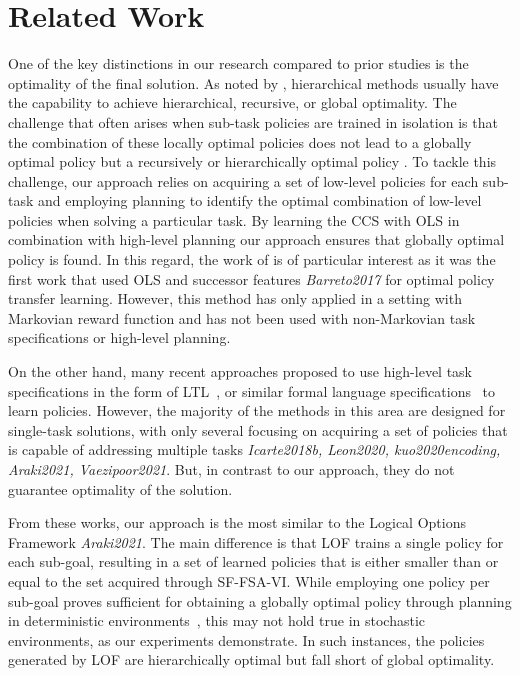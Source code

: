 \section{Related Work}
One of the key distinctions in our research compared to prior studies is the optimality of the final solution. As noted by \citep{Dietterich2000}, hierarchical methods usually have the capability to achieve hierarchical, recursive, or global optimality. The challenge that often arises when sub-task policies are trained in isolation is that the combination of these locally optimal policies does not lead to a globally optimal policy but a recursively \citep{Dayan1992} or hierarchically optimal policy \citep{Sutton1999, Mann2015, Araki2021}.  To tackle this challenge, our approach relies on acquiring a set of low-level policies for each sub-task and employing planning to identify the optimal combination of low-level policies when solving a particular task. By learning the CCS with OLS \citep{Roijers2014} in combination with high-level planning our approach ensures that globally optimal policy is found. In this regard, the work of \citep{Alegre2022} is of particular interest as it was the first work that used OLS and successor features \textit{Barreto2017} for optimal policy transfer learning. However, this method has only applied in a setting with Markovian reward function and has not been used with non-Markovian task specifications or high-level planning. 

On the other hand, many recent approaches proposed to use high-level task specifications in the form of LTL~\citep{Icarte2018b, Kuo2020, Vaezipoor2021, Jothimurugan2021}, or similar formal language specifications~\citep{ToroIcarte2019,Camacho2019, Araki2021, Icarte2022} to learn policies. However, the majority of the methods in this area are designed for single-task solutions, with only several focusing on acquiring a set of policies that is capable of addressing multiple tasks \textit{Icarte2018b, Leon2020, kuo2020encoding, Araki2021, Vaezipoor2021}. But, in contrast to our approach, they do not guarantee optimality of the solution.

From these works, our approach is the most similar to the Logical Options Framework \textit{Araki2021}. The main difference is that LOF trains a single policy for each sub-goal, resulting in a set of learned policies that is either smaller than or equal to the set acquired through SF-FSA-VI. While employing one policy per sub-goal proves sufficient for obtaining a globally optimal policy through planning in deterministic environments~\citep{Wen2020}, this may not hold true in stochastic environments, as our experiments demonstrate. In such instances, the policies generated by LOF are hierarchically optimal but fall short of global optimality.


